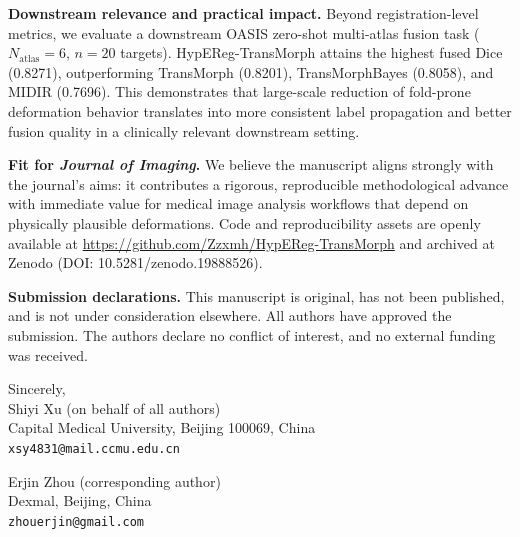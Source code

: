\documentclass[11pt,a4paper]{article}
\begin{document}
\vspace{0.2em}
\noindent\textbf{Downstream relevance and practical impact.}
Beyond registration-level metrics, we evaluate a downstream OASIS zero-shot multi-atlas fusion task (\(N_{\mathrm{atlas}}=6\), \(n=20\) targets). HypEReg-TransMorph attains the highest fused Dice (0.8271), outperforming TransMorph (0.8201), TransMorphBayes (0.8058), and MIDIR (0.7696). This demonstrates that large-scale reduction of fold-prone deformation behavior translates into more consistent label propagation and better fusion quality in a clinically relevant downstream setting.

\vspace{0.5em}
\noindent\textbf{Fit for \textit{Journal of Imaging}.}
We believe the manuscript aligns strongly with the journal's aims: it contributes a rigorous, reproducible methodological advance with immediate value for medical image analysis workflows that depend on physically plausible deformations. Code and reproducibility assets are openly available at \url{https://github.com/Zzxmh/HypEReg-TransMorph} and archived at Zenodo (DOI: 10.5281/zenodo.19888526).

\vspace{0.5em}
\noindent\textbf{Submission declarations.}
This manuscript is original, has not been published, and is not under consideration elsewhere. All authors have approved the submission. The authors declare no conflict of interest, and no external funding was received.

\vspace{1em}

\noindent Sincerely,\\[0.5em]
\noindent Shiyi Xu (on behalf of all authors)\\
Capital Medical University, Beijing 100069, China\\
\texttt{xsy4831@mail.ccmu.edu.cn}

\vspace{0.5em}
\noindent Erjin Zhou (corresponding author)\\
Dexmal, Beijing, China\\
\texttt{zhouerjin@gmail.com}
\end{document}
